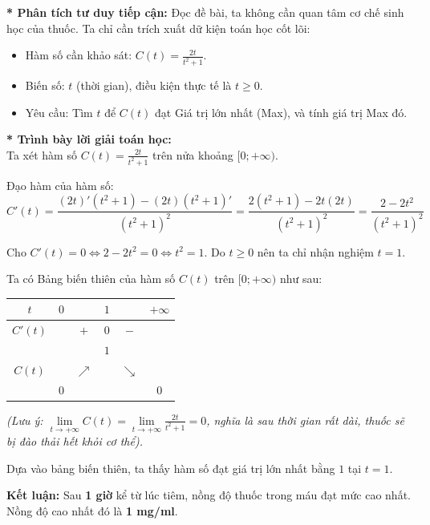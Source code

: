 \documentclass[12pt]{article}
\begin{document}
	\begin{loigiai}
		\textbf{* Phân tích tư duy tiếp cận:} 
		Đọc đề bài, ta không cần quan tâm cơ chế sinh học của thuốc. Ta chỉ cần trích xuất dữ kiện toán học cốt lõi:
		\begin{itemize}
			\item Hàm số cần khảo sát: $C(t) = \frac{2t}{t^2 + 1}$.
			\item Biến số: $t$ (thời gian), điều kiện thực tế là $t \ge 0$.
			\item Yêu cầu: Tìm $t$ để $C(t)$ đạt Giá trị lớn nhất (Max), và tính giá trị Max đó.
		\end{itemize}
		
		\vspace{2mm}
		\textbf{* Trình bày lời giải toán học:} \\
		Ta xét hàm số $C(t) = \frac{2t}{t^2 + 1}$ trên nửa khoảng $[0; +\infty)$.
		
		Đạo hàm của hàm số:
		\[ C'(t) = \frac{(2t)'(t^2 + 1) - (2t)(t^2 + 1)'}{(t^2 + 1)^2} = \frac{2(t^2 + 1) - 2t(2t)}{(t^2 + 1)^2} = \frac{2 - 2t^2}{(t^2 + 1)^2} \]
		
		Cho $C'(t) = 0 \Leftrightarrow 2 - 2t^2 = 0 \Leftrightarrow t^2 = 1$. 
		Do $t \ge 0$ nên ta chỉ nhận nghiệm $t = 1$.
		
		\vspace{2mm}
		Ta có Bảng biến thiên của hàm số $C(t)$ trên $[0; +\infty)$ như sau:
		\begin{center}
			\renewcommand{\arraystretch}{1.5}
			\begin{tabular}{|c|lcccc|}
				\hline
				$t$ & $0$ & & $1$ & & $+\infty$ \\ \hline
				$C'(t)$ & & $+$ & $0$ & $-$ & \\ \hline
				& & & $1$ & & \\
				$C(t)$ & & $\nearrow$ & & $\searrow$ & \\
				& $0$ & & & & $0$ \\ \hline
			\end{tabular}
		\end{center}
		
		\textit{(Lưu ý: $\lim\limits_{t \to +\infty} C(t) = \lim\limits_{t \to +\infty} \frac{2t}{t^2+1} = 0$, nghĩa là sau thời gian rất dài, thuốc sẽ bị đào thải hết khỏi cơ thể).}
		
		\vspace{2mm}
		Dựa vào bảng biến thiên, ta thấy hàm số đạt giá trị lớn nhất bằng $1$ tại $t = 1$.
		
		\textbf{Kết luận:} Sau \textbf{1 giờ} kể từ lúc tiêm, nồng độ thuốc trong máu đạt mức cao nhất. Nồng độ cao nhất đó là \textbf{1 mg/ml}.
	\end{loigiai}
	
\end{document}
